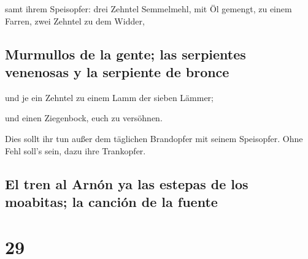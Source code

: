  samt ihrem Speisopfer: drei Zehntel Semmelmehl, mit Öl
gemengt, zu einem Farren, zwei Zehntel zu dem Widder,

\hypertarget{murmullos-de-la-gente-las-serpientes-venenosas-y-la-serpiente-de-bronce}{%
\subsection{Murmullos de la gente; las serpientes venenosas y la
serpiente de
bronce}\label{murmullos-de-la-gente-las-serpientes-venenosas-y-la-serpiente-de-bronce}}

 und je ein Zehntel zu einem Lamm der sieben Lämmer;

 und einen Ziegenbock, euch zu versöhnen.

 Dies sollt ihr tun außer dem täglichen Brandopfer mit
seinem Speisopfer. Ohne Fehl soll's sein, dazu ihre Trankopfer.

\hypertarget{el-tren-al-arnuxf3n-ya-las-estepas-de-los-moabitas-la-canciuxf3n-de-la-fuente}{%
\subsection{El tren al Arnón ya las estepas de los moabitas; la canción
de la
fuente}\label{el-tren-al-arnuxf3n-ya-las-estepas-de-los-moabitas-la-canciuxf3n-de-la-fuente}}

\hypertarget{section-28}{%
\section{29}\label{section-28}}

